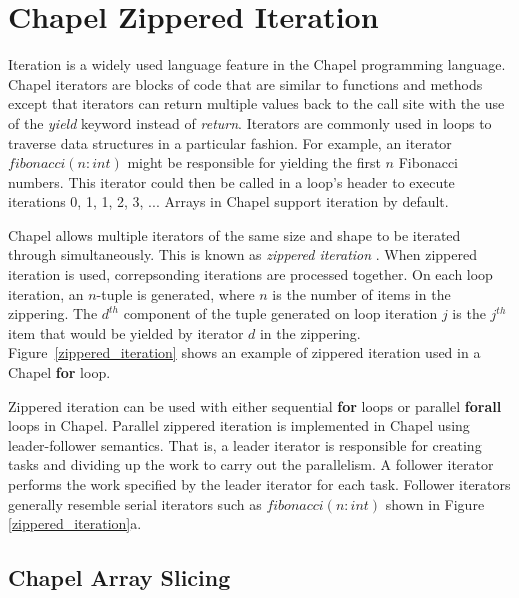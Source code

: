 \section{Chapel Zippered Iteration}\label{sec:zippered_iteration}

Iteration is a widely used language feature in the Chapel programming language. Chapel iterators are blocks of code that are similar to functions and methods except that iterators can return multiple values back to the call site with the use of the \textit{yield} keyword instead of \textit{return}. Iterators are commonly used in loops to traverse data structures in a particular fashion. For example, an iterator $fibonacci(n: int)$ might be responsible for yielding the first $n$ Fibonacci numbers. This iterator could then be called in a loop's header to execute iterations 0, 1, 1, 2, 3, ... Arrays in Chapel support iteration by default. 

Chapel allows multiple iterators of the same size and shape to be iterated through simultaneously. This is known as \textit{zippered iteration} \cite{chamberlain2011user}. When zippered iteration is used, correpsonding iterations are processed together. On each loop iteration, an $n$-tuple is generated, where $n$ is the number of items in the zippering. The $d^{th}$ component of the tuple generated on loop iteration $j$ is the $j^{th}$ item that would be yielded by iterator $d$ in the zippering. Figure~\ref{zippered_iteration} shows an example of zippered iteration used in a Chapel \textbf{for} loop. 

Zippered iteration can be used with either sequential \textbf{for} loops or parallel \textbf{forall} loops in Chapel. Parallel zippered iteration is implemented in Chapel using leader-follower semantics. That is, a leader iterator is responsible for creating tasks and dividing up the work to carry out the parallelism. A follower iterator performs the work specified by the leader iterator for each task. Follower iterators generally resemble  serial iterators such as $fibonacci(n : int)$ shown in Figure \ref{zippered_iteration}a.

\subsection{Chapel Array Slicing}\label{sec:array_slicing}

